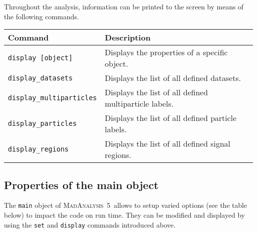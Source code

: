 \documentclass[a4paper]{article}
\newcommand{\MA}{\textsc{MadAnalysis}~5}
\begin{document}
Throughout the analysis, information can be printed to the screen by means of
the following commands.
\renewcommand{\arraystretch}{1.2}%
\begin{center}\begin{tabular}{p{4.00cm} p{7.70cm}}
\hline
Command & Description\\
\hline
\color{ao} \verb+display [object]+       & Displays the properties of a specific object.\\
\color{ao} \verb+display_datasets+       & Displays the list of all defined datasets.\\
\color{ao} \verb+display_multiparticles+ &
   Displays the list of all defined multiparticle labels.\\
\color{ao} \verb+display_particles+      &
   Displays the list of all defined particle labels.\\
\color{ao} \verb+display_regions+        &
   Displays the list of all defined signal regions.\\
\hline
\end{tabular}
\end{center}
\newpage
\begin{shaded}
\section{\Large Properties of the main object}
\end{shaded}


The \verb+main+ object of \MA\ allows to setup varied options (see the table
below) to impact the code on run time. They can be modified and
displayed by using the \verb+set+ and \verb+display+ commands introduced above.\\
\end{document}
